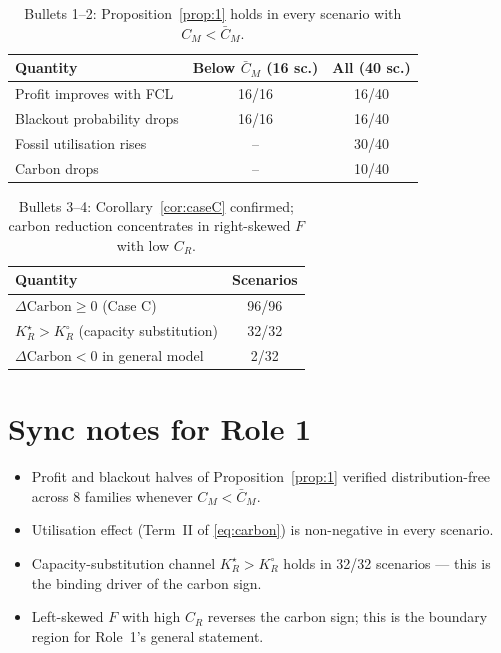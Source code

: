 \documentclass[11pt]{article}
\theoremstyle{definition}
\begin{document}
\begin{table}[h]\centering
\begin{tabular}{lcc}
\toprule
Quantity & Below $\bar C_M$ (16 sc.) & All (40 sc.) \\
\midrule
Profit improves with FCL          & 16/16 & 16/40 \\
Blackout probability drops        & 16/16 & 16/40 \\
Fossil utilisation rises          & --    & 30/40 \\
Carbon drops                      & --    & 10/40 \\
\bottomrule
\end{tabular}
\caption{Bullets 1--2: Proposition~\ref{prop:1} holds in every scenario with $C_M<\bar C_M$.}
\end{table}

\begin{table}[h]\centering
\begin{tabular}{lc}
\toprule
Quantity & Scenarios \\
\midrule
$\Delta\text{Carbon}\ge 0$ (Case C)              & 96/96 \\
$K_R^{\star}>K_R^{\circ}$ (capacity substitution) & 32/32 \\
$\Delta\text{Carbon}<0$ in general model          & 2/32 \\
\bottomrule
\end{tabular}
\caption{Bullets 3--4: Corollary~\ref{cor:caseC} confirmed; carbon reduction concentrates in right-skewed $F$ with low $C_R$.}
\end{table}

\section{Sync notes for Role 1}
\begin{itemize}
\item Profit and blackout halves of Proposition~\ref{prop:1} verified distribution-free across 8 families whenever $C_M<\bar C_M$.
\item Utilisation effect (Term~II of \eqref{eq:carbon}) is non-negative in every scenario.
\item Capacity-substitution channel $K_R^{\star}>K_R^{\circ}$ holds in 32/32 scenarios --- this is the binding driver of the carbon sign.
\item Left-skewed $F$ with high $C_R$ reverses the carbon sign; this is the boundary region for Role~1's general statement.
\end{itemize}
\end{document}
